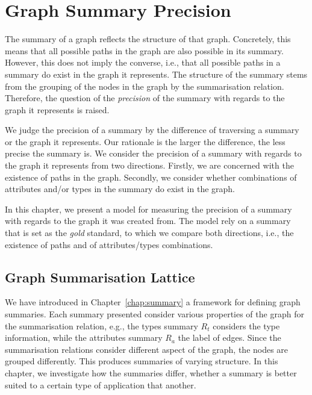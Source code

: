 \chapter{Graph Summary Precision}
\label{chap03:sec:quality}

The summary of a graph reflects the structure of that graph. Concretely, this means that all possible paths in the graph are also possible in its summary. However, this does not imply the converse, i.e., that all possible paths in a summary do exist in the graph it represents. The structure of the summary stems from the grouping of the nodes in the graph by the summarisation relation. Therefore, the question of the \emph{precision} of the summary with regards to the graph it represents is raised.

We judge the precision of a summary by the difference of traversing a summary or the graph it represents. Our rationale is the larger the difference, the less precise the summary is. We consider the precision of a summary with regards to the graph it represents from two directions. Firstly, we are concerned with the existence of paths in the graph. Secondly, we consider whether combinations of attributes and/or types in the summary do exist in the graph. 

In this chapter, we present a model for measuring the precision of a summary with regards to the graph it was created from. The model rely on a summary that is set as the \emph{gold} standard, to which we compare both directions, i.e., the existence of paths and of attributes/types combinations.

\section{Graph Summarisation Lattice}

We have introduced in Chapter~\ref{chap:summary} a framework for defining graph summaries. Each summary presented consider various properties of the graph for the summarisation relation, e.g., the types summary $R_t$ considers the type information, while the attributes summary $R_a$ the label of edges. Since the summarisation relations consider different aspect of the graph, the nodes are grouped differently. This produces summaries of varying structure. In this chapter, we investigate how the summaries differ, whether a summary is better suited to a certain type of application that another.

